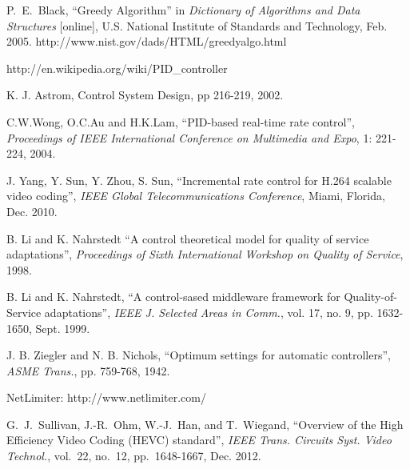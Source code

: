 \documentclass[journal]{IEEEtran}
\begin{document}
\begin{thebibliography}{1}
P.~E.~Black, ``Greedy Algorithm'' in {\em Dictionary of Algorithms and Data Structures} [online], U.S. National Institute of Standards and Technology, Feb. 2005.
\newblock http://www.nist.gov/dads/HTML/greedyalgo.html

http://en.wikipedia.org/wiki/PID\_controller

K. J. Astrom, Control System Design, pp 216-219, 2002.

C.W.Wong, O.C.Au and H.K.Lam, ``PID-based real-time rate control'', {\em Proceedings of IEEE International Conference on Multimedia and Expo}, 1: 221-224, 2004.

J. Yang, Y. Sun, Y. Zhou, S. Sun, ``Incremental rate control for H.264 scalable video coding'', {\em IEEE Global Telecommunications Conference}, Miami, Florida, Dec. 2010.

B. Li and K. Nahrstedt  ``A control theoretical model for quality of service adaptations'', {\em Proceedings of Sixth International Workshop on Quality of Service}, 1998.

B. Li and K. Nahrstedt, ``A control-sased middleware framework for Quality-of-Service adaptations'', {\em IEEE J. Selected Areas in Comm.}, vol. 17, no. 9, pp. 1632-1650, Sept. 1999.

J. B. Ziegler and N. B. Nichols, ``Optimum settings for automatic controllers'', {\em ASME Trans.}, pp. 759-768, 1942.

NetLimiter: http://www.netlimiter.com/

G.~J.~Sullivan, J.-R.~Ohm, W.-J.~Han, and T.~Wiegand, ``Overview of the High Efficiency Video Coding (HEVC) standard'', {\em IEEE Trans. Circuits Syst. Video Technol.}, vol.~22, no.~12, pp.~1648-1667, Dec. 2012. 

\end{thebibliography}



% 
\end{document}
